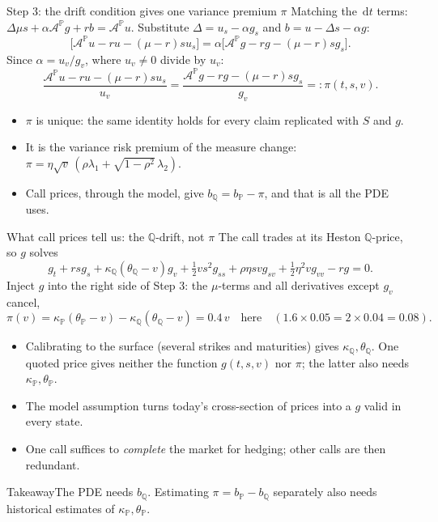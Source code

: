 \documentclass[handout,10pt,t,aspectratio=169]{beamer}
\newenvironment{keybox}{\begin{exampleblock}{Takeaway}}{\end{exampleblock}}
\newcommand{\Q}{\mathbb Q}
\newcommand{\Pp}{\mathbb P}
\newcommand{\dd}{\,\mathrm d}
\begin{document}
\begin{frame}{Step 3: the drift condition gives one variance premium \(\pi\)}
\small
Matching the \(\dd t\) terms:\quad
\(\Delta\mu s+\alpha\mathcal A^\Pp g+rb=\mathcal A^\Pp u.\)
Substitute \(\Delta=u_s-\alpha g_s\) and \(b=u-\Delta s-\alpha g\):
\[
\bigl[\mathcal A^\Pp u-ru-(\mu-r)su_s\bigr]
=\alpha\bigl[\mathcal A^\Pp g-rg-(\mu-r)sg_s\bigr].
\]
Since \(\alpha=u_v/g_v\), where \(u_v\ne0\) divide by \(u_v\):
\[
\boxed{\frac{\mathcal A^\Pp u-ru-(\mu-r)su_s}{u_v}
=\frac{\mathcal A^\Pp g-rg-(\mu-r)sg_s}{g_v}=:\pi(t,s,v).}
\]
\begin{itemize}
\item \(\pi\) is unique: the same identity holds for every claim replicated with \(S\) and \(g\).
\item It is the variance risk premium of the measure change:
\(\pi=\eta\sqrt v\,(\rho\lambda_1+\sqrt{1-\rho^2}\,\lambda_2)\).
\item Call prices, through the model, give \(b_\Q=b_\Pp-\pi\), and that is all the PDE uses.
\end{itemize}
\end{frame}

\begin{frame}{What call prices tell us: the \(\Q\)-drift, not \(\pi\)}
\small
The call trades at its Heston \(\Q\)-price, so \(g\) solves
\[
g_t+rsg_s+\kappa_\Q(\theta_\Q-v)g_v+\tfrac12vs^2g_{ss}+\rho\eta svg_{sv}
+\tfrac12\eta^2vg_{vv}-rg=0.
\]
Inject \(g\) into the right side of Step 3: the \(\mu\)-terms and all derivatives except \(g_v\) cancel,
\[
\pi(v)=\kappa_\Pp(\theta_\Pp-v)-\kappa_\Q(\theta_\Q-v)=0.4\,v\quad\text{here}
\quad(1.6\times0.05=2\times0.04=0.08).
\]
\begin{itemize}
\item Calibrating to the surface (several strikes and maturities) gives \(\kappa_\Q,\theta_\Q\).
One quoted price gives neither the function \(g(t,s,v)\) nor \(\pi\); the latter also needs \(\kappa_\Pp,\theta_\Pp\).
\item The model assumption turns today's cross-section of prices into a \(g\) valid in every state.
\item One call suffices to \emph{complete} the market for hedging; other calls are then redundant.
\end{itemize}
\begin{keybox}The PDE needs \(b_\Q\). Estimating \(\pi=b_\Pp-b_\Q\) separately
also needs historical estimates of \(\kappa_\Pp,\theta_\Pp\).\end{keybox}
\end{frame}
\end{document}
